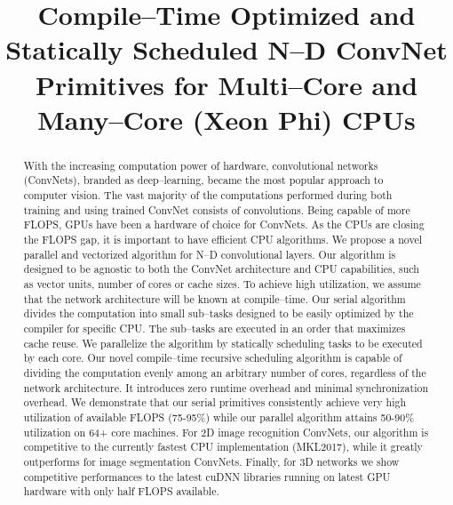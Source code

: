 \documentclass[10pt, conference, compsocconf]{./IEEEtran/IEEEtran}
\begin{document}
\setlength{\pdfpageheight}{\paperheight}
\setlength{\pdfpagewidth}{\paperwidth}

\title{Compile--Time Optimized and Statically Scheduled N--D ConvNet
  Primitives for Multi--Core and Many--Core (Xeon Phi) CPUs }


\author{ } \maketitle



\begin{abstract}

  With the increasing computation power of hardware, convolutional
  networks (ConvNets), branded as deep--learning, became the most
  popular approach to computer vision.  The vast majority of the
  computations performed during both training and using trained
  ConvNet consists of convolutions.  Being capable of more FLOPS, GPUs
  have been a hardware of choice for ConvNets.  As the CPUs are
  closing the FLOPS gap, it is important to have efficient CPU
  algorithms.  We propose a novel parallel and vectorized algorithm
  for N--D convolutional layers.  Our algorithm is designed to be
  agnostic to both the ConvNet architecture and CPU capabilities, such
  as vector units, number of cores or cache sizes.  To achieve high
  utilization, we assume that the network architecture will be known
  at compile--time.  Our serial algorithm divides the computation into
  small sub--tasks designed to be easily optimized by the compiler for
  specific CPU.  The sub--tasks are executed in an order that
  maximizes cache reuse.  We parallelize the algorithm by statically
  scheduling tasks to be executed by each core.  Our novel
  compile--time recursive scheduling algorithm is capable of dividing
  the computation evenly among an arbitrary number of cores,
  regardless of the network architecture.  It introduces zero runtime
  overhead and minimal synchronization overhead.  We demonstrate that
  our serial primitives consistently achieve very high utilization of
  available FLOPS (75-95\%) while our parallel algorithm attains
  50-90\% utilization on 64+ core machines.  For 2D image recognition
  ConvNets, our algorithm is competitive to the currently fastest CPU
  implementation (MKL2017), while it greatly outperforms for image
  segmentation ConvNets.  Finally, for 3D networks we show competitive
  performances to the latest cuDNN libraries running on latest GPU
  hardware with only half FLOPS available.

\end{abstract}
\setlength{\belowcaptionskip}{-15pt}






%
%


%

{\small


}
\end{document}
